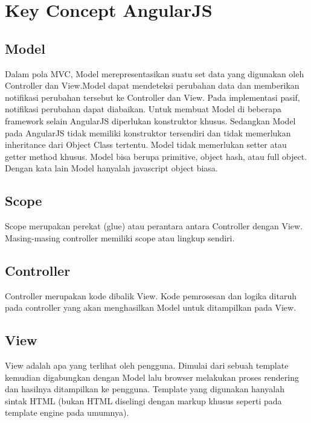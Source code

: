 \section{Key Concept AngularJS}
\label{sec: keyConceptAngularJS}

\subsection{Model}
\label{sub: model}

	Dalam pola MVC, Model merepresentasikan suatu set data yang digunakan oleh Controller dan View.Model dapat mendeteksi perubahan data dan memberikan notifikasi perubahan tersebut ke Controller dan View. Pada implementasi pasif, notifikasi perubahan dapat diabaikan. Untuk membuat Model di beberapa framework selain AngularJS diperlukan konstruktor khusus. Sedangkan Model pada AngularJS tidak memiliki konstruktor tersendiri dan tidak memerlukan inheritance dari Object Class tertentu. Model tidak memerlukan setter atau getter method khusus. Model bisa berupa primitive, object hash, atau full object. Dengan kata lain Model hanyalah javascript object biasa.

\subsection{Scope}
\label{sub: Scope}

	Scope merupakan perekat (glue) atau perantara antara Controller dengan View. Masing-masing controller memiliki scope atau lingkup sendiri.
	
\subsection{Controller}
\label{sub: controller}

	Controller merupakan kode dibalik View. Kode pemrosesan dan logika ditaruh pada controller yang akan menghasilkan Model untuk ditampilkan pada View.

\subsection{View}
\label{sub: view}

	View adalah apa yang terlihat oleh pengguna. Dimulai dari sebuah template kemudian digabungkan dengan Model lalu browser melakukan proses rendering dan hasilnya ditampilkan ke pengguna. Template yang digunakan hanyalah sintak HTML (bukan HTML diselingi dengan markup khusus seperti pada template engine pada umumnya).

